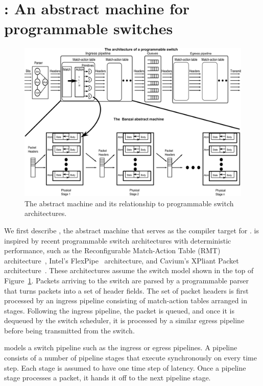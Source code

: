 \section{\absmachine: An abstract machine for programmable switches}
\label{s:absmachine}

\begin{figure}[!t]
  \includegraphics[width=\textwidth]{banzai.pdf}
  \caption{The \absmachine abstract machine and its relationship to programmable switch architectures.}
  \label{fig:switch}
\end{figure}

We first describe \absmachine, the abstract machine that serves as the
compiler target for \pktlanguage. \absmachine is inspired by recent
programmable switch architectures with deterministic performance, such
as the Reconfigurable Match-Action Table (RMT)
architecture~\cite{rmt}, Intel's FlexPipe~\cite{flexpipe} architecture, and
Cavium's XPliant Packet architecture~\cite{xpliant}. These architectures assume the switch
model shown in the top of Figure~\ref{fig:switch}.  Packets arriving
to the switch are parsed by a programmable parser that turns packets
into a set of header fields. The set of packet headers is first
processed by an ingress pipeline consisting of match-action tables
arranged in stages. Following the ingress pipeline, the packet is
queued, and once it is dequeued by the switch scheduler, it is
processed by a similar egress pipeline before being transmitted from
the switch.

\absmachine models a switch pipeline such as the ingress or egress
pipelines. A pipeline consists of a number of pipeline stages that
execute synchronously on every time step. Each stage is assumed to
have one time step of latency. Once a pipeline stage processes a
packet, it hands it off to the next pipeline stage.

